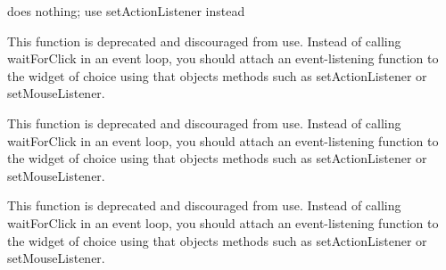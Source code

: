 
\begin{DoxyRefList}
\item[\label{deprecated__deprecated000006}%
\Hypertarget{deprecated__deprecated000006}%
Member \mbox{\hyperlink{classsgl_1_1GInteractor_a02f20ea6edfa0671f31c4c648a253833}{G\+Interactor\+:\+:add\+Action\+Listener}} () Q\+\_\+\+D\+E\+C\+L\+\_\+\+D\+E\+P\+R\+E\+C\+A\+T\+ED]does nothing; use set\+Action\+Listener instead  
\item[\label{deprecated__deprecated000003}%
\Hypertarget{deprecated__deprecated000003}%
Member \mbox{\hyperlink{namespacesgl_a2cc1dab98b5712012e365c8afdc04bc4}{sgl\+:\+:get\+Next\+Event}} (int mask=A\+N\+Y\+\_\+\+E\+V\+E\+NT)]This function is deprecated and discouraged from use. Instead of calling wait\+For\+Click in an event loop, you should attach an event-\/listening function to the widget of choice using that object\textquotesingle{}s methods such as set\+Action\+Listener or set\+Mouse\+Listener.  
\item[\label{deprecated__deprecated000004}%
\Hypertarget{deprecated__deprecated000004}%
Member \mbox{\hyperlink{namespacesgl_ae6780e0be2caaa8a595026b472e74808}{sgl\+:\+:wait\+For\+Click}} ()]This function is deprecated and discouraged from use. Instead of calling wait\+For\+Click in an event loop, you should attach an event-\/listening function to the widget of choice using that object\textquotesingle{}s methods such as set\+Action\+Listener or set\+Mouse\+Listener.  
\item[\label{deprecated__deprecated000005}%
\Hypertarget{deprecated__deprecated000005}%
Member \mbox{\hyperlink{namespacesgl_ac49283a36a844e5c07ce0b199f481c9f}{sgl\+:\+:wait\+For\+Event}} (int mask=A\+N\+Y\+\_\+\+E\+V\+E\+NT)]This function is deprecated and discouraged from use. Instead of calling wait\+For\+Click in an event loop, you should attach an event-\/listening function to the widget of choice using that object\textquotesingle{}s methods such as set\+Action\+Listener or set\+Mouse\+Listener. 
\end{DoxyRefList}